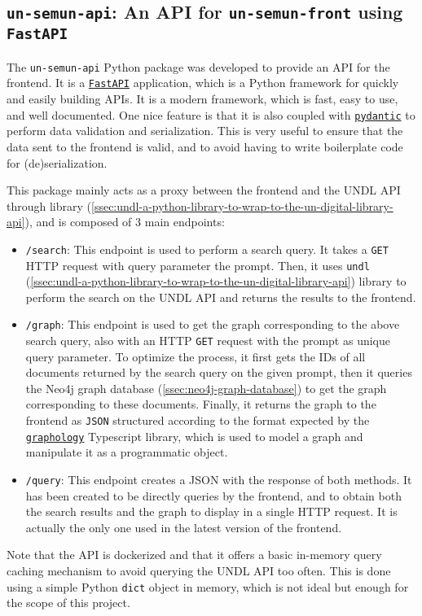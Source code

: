 
\subsection{\texttt{un-semun-api}: An API for \texttt{un-semun-front} using \texttt{FastAPI}} \label{ssec:un-semun-api-an-api-for-un-semun-front-using-fastapi}

The \texttt{un-semun-api} Python package was developed to provide an API for the frontend. It is a \href{https://fastapi.tiangolo.com/}{\texttt{FastAPI}} application, which is a Python framework for quickly and easily building APIs. It is a modern framework, which is fast, easy to use, and well documented. One nice feature is that it is also coupled with \href{https://docs.pydantic.dev/latest/}{\texttt{pydantic}} to perform data validation and serialization. This is very useful to ensure that the data sent to the frontend is valid, and to avoid having to write boilerplate code for (de)serialization.

This package mainly acts as a proxy between the frontend and the UNDL API through  library (\ref{ssec:undl-a-python-library-to-wrap-to-the-un-digital-library-api}), and is composed of $3$ main endpoints:

\begin{itemize}
    \item \texttt{/search}: This endpoint is used to perform a search query.  It takes a \texttt{GET} HTTP request with query parameter the prompt. Then, it uses \texttt{undl} (\ref{ssec:undl-a-python-library-to-wrap-to-the-un-digital-library-api}) library to perform the search on the UNDL API and returns the results to the frontend.

    \item \texttt{/graph}: This endpoint is used to get the graph corresponding to the above search query, also with an HTTP \texttt{GET} request with the prompt as unique query parameter. To optimize the process, it first gets the IDs of all documents returned by the search query on the given prompt, then it queries the Neo4j graph database (\ref{ssec:neo4j-graph-database}) to get the graph corresponding to these documents. Finally, it returns the graph to the frontend as \texttt{JSON} structured according to the format expected by the \href{https://graphology.github.io/}{\texttt{graphology}} Typescript library, which is used to model a graph and manipulate it as a programmatic object.

    \item \texttt{/query}: This endpoint creates a JSON with the response of both methods. It has been created to be directly queries by the frontend, and to obtain both the search results and the graph to display in a single HTTP request. It is actually the only one used in the latest version of the frontend.
\end{itemize}

Note that the API is dockerized and that it offers a basic in-memory query caching mechanism to avoid querying the UNDL API too often. This is done using a simple Python \texttt{dict} object in memory, which is not ideal but enough for the scope of this project.